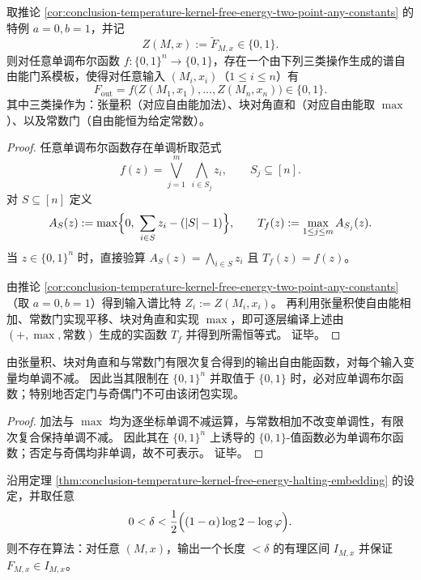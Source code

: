 \begin{theorem}[谱自由能门系对单调布尔逻辑的完备嵌入]\label{thm:conclusion-free-energy-monotone-boolean-embedding}
取推论 \ref{cor:conclusion-temperature-kernel-free-energy-two-point-any-constants} 的特例 \(a=0,b=1\)，并记
\[
Z(M,x):=\widetilde F_{M,x}\in\{0,1\}.
\]
则对任意单调布尔函数 \(f:\{0,1\}^n\to\{0,1\}\)，存在一个由下列三类操作生成的谱自由能门系模板，使得对任意输入 \((M_i,x_i)\)（\(1\le i\le n\)）有
\[
F_{\mathrm{out}}=f\bigl(Z(M_1,x_1),\dots,Z(M_n,x_n)\bigr)\in\{0,1\}.
\]
其中三类操作为：张量积（对应自由能加法）、块对角直和（对应自由能取 \(\max\)）、以及常数门（自由能恒为给定常数）。
\end{theorem}
\begin{proof}
任意单调布尔函数存在单调析取范式
\[
f(z)=\bigvee_{j=1}^{m}\ \bigwedge_{i\in S_j} z_i,
\qquad S_j\subseteq[n].
\]
对 \(S\subseteq[n]\) 定义
\[
A_S(z):=\max\Bigl\{0,\ \sum_{i\in S}z_i-(|S|-1)\Bigr\},
\qquad
T_f(z):=\max_{1\le j\le m}A_{S_j}(z).
\]
当 \(z\in\{0,1\}^n\) 时，直接验算 \(A_S(z)=\bigwedge_{i\in S}z_i\) 且 \(T_f(z)=f(z)\)。
\par
由推论 \ref{cor:conclusion-temperature-kernel-free-energy-two-point-any-constants}（取 \(a=0,b=1\)）得到输入谱比特 \(Z_i:=Z(M_i,x_i)\)。
再利用张量积使自由能相加、常数门实现平移、块对角直和实现 \(\max\)，即可逐层编译上述由 \((+,\max,\text{常数})\) 生成的实函数 \(T_f\) 并得到所需恒等式。
证毕。
\end{proof}

\begin{proposition}[谱自由能门系的单调性障碍]\label{prop:conclusion-free-energy-gates-monotonicity-obstruction}
由张量积、块对角直和与常数门有限次复合得到的输出自由能函数，对每个输入变量均单调不减。
因此当其限制在 \(\{0,1\}^n\) 并取值于 \(\{0,1\}\) 时，必对应单调布尔函数；特别地否定门与奇偶门不可由该闭包实现。
\end{proposition}
\begin{proof}
加法与 \(\max\) 均为逐坐标单调不减运算，与常数相加不改变单调性，有限次复合保持单调不减。
因此其在 \(\{0,1\}^n\) 上诱导的 \(\{0,1\}\)-值函数必为单调布尔函数；否定与奇偶均非单调，故不可表示。
证毕。
\end{proof}

\begin{corollary}[谱自由能的高精度近似不可判定]\label{cor:conclusion-temperature-kernel-free-energy-nonapproximable}
沿用定理 \ref{thm:conclusion-temperature-kernel-free-energy-halting-embedding} 的设定，并取任意
\[
0<\delta<\frac12\Bigl((1-\alpha)\log 2-\log\varphi\Bigr).
\]
则不存在算法：对任意 \((M,x)\)，输出一个长度 \(<\delta\) 的有理区间 \(I_{M,x}\) 并保证 \(F_{M,x}\in I_{M,x}\)。
\end{corollary}

